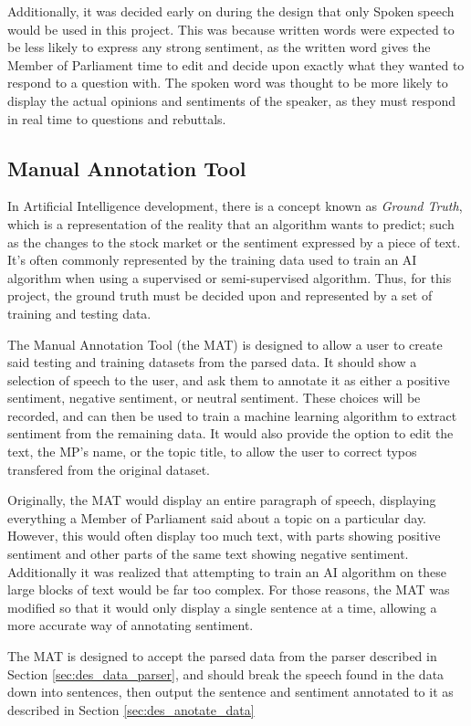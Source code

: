 Additionally, it was decided early on during the design that only Spoken speech would be used in this project. This was because written words were expected to be less likely to express any strong sentiment, as the written word gives the Member of Parliament time to edit and decide upon exactly what they wanted to respond to a question with. The spoken word was thought to be more likely to display the actual opinions and sentiments of the speaker, as they must respond in real time to questions and rebuttals.

\subsection{Manual Annotation Tool}
\label{sec:des_annotation_tool}
In Artificial Intelligence development, there is a concept known as \emph{Ground Truth}, which is a representation of the reality that an algorithm wants to predict; such as the changes to the stock market or the sentiment expressed by a piece of text. It's often commonly represented by the training data used to train an AI algorithm when using a supervised or semi-supervised algorithm. Thus, for this project, the ground truth must be decided upon and represented by a set of training and testing data.

The Manual Annotation Tool (the MAT) is designed to allow a user to create said testing and training datasets from the parsed data. It should show a selection of speech to the user, and ask them to annotate it as either a positive sentiment, negative sentiment, or neutral sentiment. These choices will be recorded, and can then be used to train a machine learning algorithm to extract sentiment from the remaining data. It would also provide the option to edit the text, the MP's name, or the topic title, to allow the user to correct typos transfered from the original dataset.

Originally, the MAT would display an entire paragraph of speech, displaying everything a Member of Parliament said about a topic on a particular day. However, this would often display too much text, with parts showing positive sentiment and other parts of the same text showing negative sentiment. Additionally it was realized that attempting to train an AI algorithm on these large blocks of text would be far too complex. For those reasons, the MAT was modified so that it would only display a single sentence at a time, allowing a more accurate way of annotating sentiment.

The MAT is designed to accept the parsed data from the parser described in Section \ref{sec:des_data_parser}, and should break the speech found in the data down into sentences, then output the sentence and sentiment annotated to it as described in Section \ref{sec:des_anotate_data}

